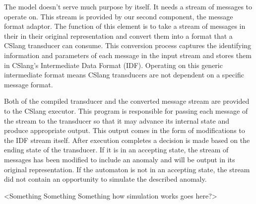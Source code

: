 The model doesn't serve much purpose by itself.  It needs a stream of
messages to operate on.  This stream is provided by our second component,
the message format adaptor.
The function of this element is to take a
stream of messages in their in their original representation and convert
them into a format that a CSlang transducer can consume. This conversion process
captures the identifying information and parameters of each message in the
input stream and stores them in CSlang's Intermediate Data Format (IDF).
Operating on this generic intermediate format means CSlang transducers are
not dependent on a specific message format.


Both of the compiled transducer and the converted message stream 
are provided to the CSlang executor.
This program is responsible for passing each message of the stream
to the transducer
so that it may advance its internal state and
produce appropriate output.
This output comes in the form of modifications to the IDF stream itself.
After execution completes a decision is made based on the ending state of
the transducer.  If it is in an accepting state, the stream of messages has
been modified to include an anomaly and will be output in its original
representation.  If the automaton is not in an accepting state, the stream
did not contain an opportunity to simulate the described anomaly.

<Something Something Something how simulation works goes here?>


